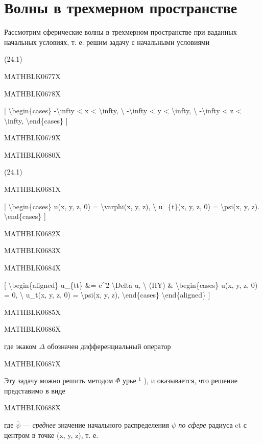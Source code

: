 \documentclass[
]{article}
\begin{document}
\section{Волны в трехмерном
пространстве}\label{ux432ux43eux43bux43dux44b-ux432-ux442ux440ux435ux445ux43cux435ux440ux43dux43eux43c-ux43fux440ux43eux441ux442ux440ux430ux43dux441ux442ux432ux435}

Рассмотрим сферические волны в трехмерном пространстве при ваданных
начальных условиях, т. е. решим задачу с начальными условиями

(24.1)

MATHBLK0677X

MATHBLK0678X

{[} \textbackslash begin\{cases\} -\textbackslash infty \textless{} x
\textless{} \textbackslash infty, \textbackslash{} -\textbackslash infty
\textless{} y \textless{} \textbackslash infty, \textbackslash{}
-\textbackslash infty \textless{} z \textless{} \textbackslash infty,
\textbackslash end\{cases\} {]}

MATHBLK0679X

MATHBLK0680X

(24.1)

MATHBLK0681X

{[} \textbackslash begin\{cases\} u(x, y, z, 0) =
\textbackslash varphi(x, y, z), \textbackslash{} u\_\{t\}(x, y, z, 0) =
\textbackslash psi(x, y, z). \textbackslash end\{cases\} {]}

MATHBLK0682X

MATHBLK0683X

MATHBLK0684X

{[} \textbackslash begin\{aligned\} u\_\{tt\} \&= c\^{}2
\textbackslash Delta u, \textbackslash{} (HY) \&
\textbackslash begin\{cases\} u(x, y, z, 0) = 0, \textbackslash{}
u\_t(x, y, z, 0) = \textbackslash psi(x, y, z),
\textbackslash end\{cases\} \textbackslash end\{aligned\} {]}

MATHBLK0685X

MATHBLK0686X

где экаком \(\Delta\) обозначен дифференциальный оператор

MATHBLK0687X

Эту задачу можно решить методом \(\Phi\) урье \(^{1}\) ), и оказывается,
что решение представимо в виде

MATHBLK0688X

где \(\overline{\psi}\) --- \emph{среднее} значение начального
распределения \(\psi\) \emph{по сфере} радиуса ct с центром в точке (x,
y, z), т. е.
\end{document}
